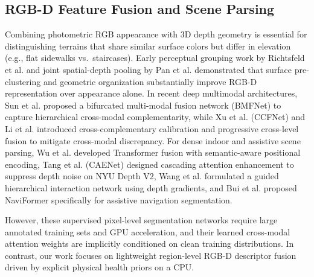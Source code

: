 \documentclass[11pt, a4paper]{article}
\begin{document}
\subsection{RGB-D Feature Fusion and Scene Parsing}
\label{subsec:rw_rgbd}
Combining photometric RGB appearance with 3D depth geometry is essential for distinguishing terrains that share similar surface colors but differ in elevation (e.g., flat sidewalks vs.\ staircases). Early perceptual grouping work by Richtsfeld et al. \cite{richtsfeld2014learning} and joint spatial-depth pooling by Pan et al. \cite{pan2016feature} demonstrated that surface pre-clustering and geometric organization substantially improve RGB-D representation over appearance alone. In recent deep multimodal architectures, Sun et al. \cite{sun2024bmfnet} proposed a bifurcated multi-modal fusion network (BMFNet) to capture hierarchical cross-modal complementarity, while Xu et al. (CCFNet) \cite{xu2023ccfnet} and Li et al. \cite{li2024progressive} introduced cross-complementary calibration and progressive cross-level fusion to mitigate cross-modal discrepancy. For dense indoor and assistive scene parsing, Wu et al. \cite{wu2024transformer} developed Transformer fusion with semantic-aware positional encoding, Tang et al. (CAENet) \cite{tang2025cascading} designed cascading attention enhancement to suppress depth noise on NYU Depth V2, Wang et al. \cite{wang2026guided} formulated a guided hierarchical interaction network using depth gradients, and Bui et al. \cite{bui2026naviformer} proposed NaviFormer specifically for assistive navigation segmentation.

However, these supervised pixel-level segmentation networks require large annotated training sets and GPU acceleration, and their learned cross-modal attention weights are implicitly conditioned on clean training distributions. In contrast, our work focuses on lightweight region-level RGB-D descriptor fusion driven by explicit physical health priors on a CPU.
\end{document}
